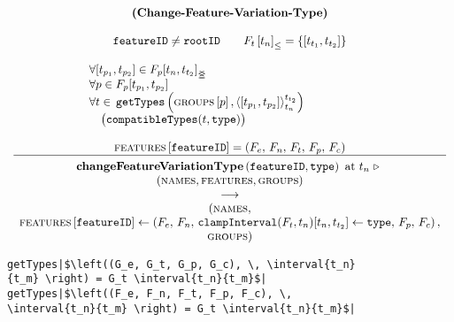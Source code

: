 \begin{figure}
    \renewcommand{\arraystretch}{1.1}
    \sossize$$\begin{array}{c}
      \ntyperule{Change-Feature-Variation-Type}
      {\\
        \var{featureID} \neq \var{rootID} \qquad
        \containing{F_t}{t_n} = \set{\interval{t_{t_1}}{t_{t_2}}} %
        \\
        \\
        \qqquad \qqquad \forall \interval{t_{p_1}}{t_{p_2}} \in \overlapping{F_p}{t_n}{t_{t_2}} \hfill \\ %
        \qqquad \qqquad \forall p \in F_p \interval{t_{p_1}}{t_{p_2}} \hfill \\%
        \qqquad \qqquad \forall t \in \, \var{getTypes}\left(\lookup{\groups}{p}, \clamp{\interval{t_{p_1}}{t_{p_2}}}{t_n}{t_{t_2}}\right) \hfill \\
        \qqquad \qqquad \quad \big(\var{compatibleTypes}(t, \var{type})\big) \hfill \\
        \\
        \lookup{\features{}}{\var{featureID}} = \left( F_e,\, F_n,\, F_t,\, F_p,\, F_c \right)
      }
      {
        \textbf{changeFeatureVariationType}\left( \var{featureID}, \var{type}\right) \text{ at } t_n \shove \\
        (\names{}, \features{}, \groups{}) \\
        \transition \\
        (\names{}, \\
        \lookup{\features{}}{\var{featureID}} \assign \left( F_e,\, F_n,\, 
        \var{clampInterval}(F_t, t_n)\interval{t_n}{t_{t_2}} \assign \var{type},\, F_p,\, F_c \right),
        \\ \groups{})
      }
    \end{array}$$
  \caption{\label{rule:change-feature-varation-type}}
\end{figure}

\begin{figure}
  \begin{verbatim}
getTypes|$\left((G_e, G_t, G_p, G_c), \, \interval{t_n}{t_m} \right) = G_t \interval{t_n}{t_m}$|
getTypes|$\left((F_e, F_n, F_t, F_p, F_c), \, \interval{t_n}{t_m} \right) = G_t \interval{t_n}{t_m}$|
  \end{verbatim}
  \caption{\label{get-types}}
\end{figure}

